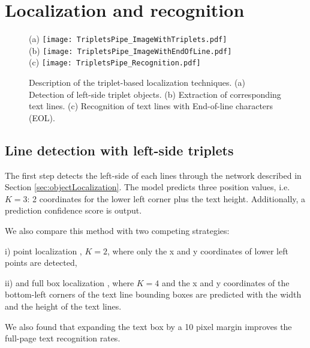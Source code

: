 \documentclass[conference]{IEEEtran}
\begin{document}
\section{Localization and recognition}

\begin{figure}[!t]
  \centering
  \small{(a)} \texttt{[image: TripletsPipe\_ImageWithTriplets.pdf]} \\
  \small{(b)} \texttt{[image: TripletsPipe\_ImageWithEndOfLine.pdf]} \\
  \small{(c)} \texttt{[image: TripletsPipe\_Recognition.pdf]}
  \caption{Description of the triplet-based localization techniques. (a) Detection of left-side triplet objects. (b) Extraction of corresponding text lines. (c) Recognition of text lines with End-of-line characters (EOL).}
  \label{fig:triplets}
\end{figure}

\subsection{Line detection with left-side triplets}
\label{sec:triplets}
The first step detects the left-side of each lines through the network described in Section \ref{sec:objectLocalization}. The model predicts three position values, i.e. $K{=}3$: 2 coordinates for the lower left corner plus the text height. Additionally, a prediction confidence score is output.

We also compare this method with two competing strategies:

i) point localization \cite{moysset2016points}, $K{=}2$, where only the x and y coordinates of lower left points are detected,

ii) and full box localization \cite{moysset2016learning}, where $K{=}4$ and the x and y coordinates of the bottom-left corners of the text line bounding boxes are predicted with the width and the height of the text lines.

We also found that expanding the text box by a 10 pixel margin
improves the full-page text recognition rates.

\end{document}

